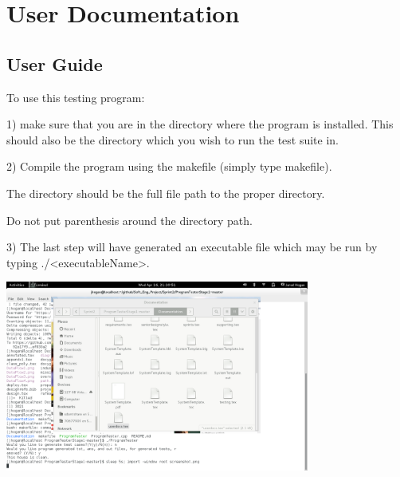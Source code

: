 
\chapter{User Documentation}



\section{User Guide}


To use this testing program:
  
 1) make sure that you are in the directory where the program is installed. This should also be the directory which you wish to run the test suite in.
 
 2) Compile the program using the makefile (simply type makefile).
 
 The directory should be the full file path to the proper directory.
 
 Do not put parenthesis around the directory path.
 
 3) The last step will have generated an executable file which may be run by typing ./<executableName>.
 
 \includegraphics[width=0.75\textwidth]{./screenshot}
 

